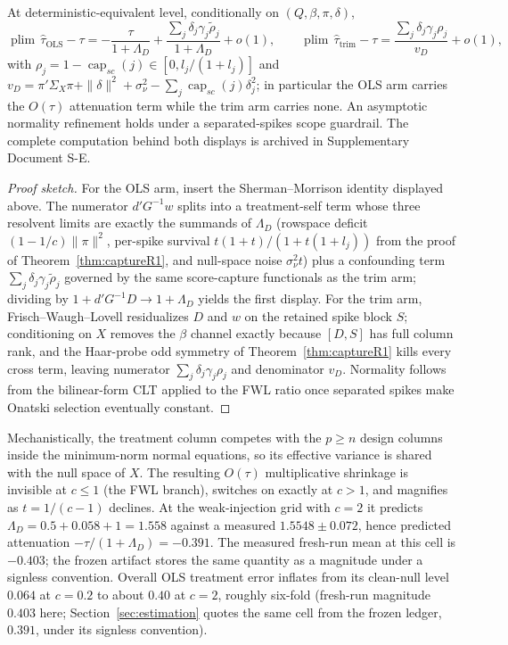 \begin{proposition}
\label{prop:trimtau}
At deterministic-equivalent level, conditionally on $(Q,\beta,\pi,\delta)$,
\[
\operatorname{plim}\,\hat\tau_{\mathrm{OLS}}-\tau
=-\frac{\tau}{1+\Lambda_D}
+\frac{\sum_j\delta_j\gamma_j\tilde\rho_j}{1+\Lambda_D}+o(1),
\qquad
\operatorname{plim}\,\hat\tau_{\mathrm{trim}}-\tau
=\frac{\sum_j\delta_j\gamma_j\rho_j}{v_D}+o(1),
\]
with $\rho_j=1-\operatorname{cap}_{sc}(j)\in[0,l_j/(1+l_j)]$ and $v_D=\pi'\Sigma_X\pi+\|\delta\|^2+\sigma_\nu^2-\sum_j\operatorname{cap}_{sc}(j)\delta_j^2$; in particular the OLS arm carries the $O(\tau)$ attenuation term while the trim arm carries none. An asymptotic normality refinement holds under a separated-spikes scope guardrail. The complete computation behind both displays is archived in Supplementary Document S-E.
\end{proposition}

\begin{proof}[Proof sketch]
For the OLS arm, insert the Sherman--Morrison identity displayed above. The numerator $d'G^{-1}w$ splits into a treatment-self term whose three resolvent limits are exactly the summands of $\Lambda_D$ (rowspace deficit $(1-1/c)\|\pi\|^2$, per-spike survival $t(1+t)/(1+t(1+l_j))$ from the proof of Theorem~\ref{thm:captureR1}, and null-space noise $\sigma_\nu^2 t$) plus a confounding term $\sum_j\delta_j\gamma_j\tilde\rho_j$ governed by the same score-capture functionals as the trim arm; dividing by $1+d'G^{-1}D\to1+\Lambda_D$ yields the first display. For the trim arm, Frisch--Waugh--Lovell residualizes $D$ and $w$ on the retained spike block $S$; conditioning on $X$ removes the $\beta$ channel exactly because $[D,S]$ has full column rank, and the Haar-probe odd symmetry of Theorem~\ref{thm:captureR1} kills every cross term, leaving numerator $\sum_j\delta_j\gamma_j\rho_j$ and denominator $v_D$. Normality follows from the bilinear-form CLT applied to the FWL ratio once separated spikes make Onatski selection eventually constant.
\end{proof}
Mechanistically, the treatment column competes with the $p\ge n$ design columns inside the minimum-norm normal equations, so its effective variance is shared with the null space of $X$. The resulting $O(\tau)$ multiplicative shrinkage is invisible at $c\le 1$ (the FWL branch), switches on exactly at $c>1$, and magnifies as $t=1/(c-1)$ declines. At the weak-injection grid with $c=2$ it predicts $\Lambda_D=0.5+0.058+1=1.558$ against a measured $1.5548\pm 0.072$, hence predicted attenuation $-\tau/(1+\Lambda_D)=-0.391$. The measured fresh-run mean at this cell is $-0.403$; the frozen artifact stores the same quantity as a magnitude under a signless convention. Overall OLS treatment error inflates from its clean-null level $0.064$ at $c=0.2$ to about $0.40$ at $c=2$, roughly six-fold (fresh-run magnitude $0.403$ here; Section~\ref{sec:estimation} quotes the same cell from the frozen ledger, $0.391$, under its signless convention).

